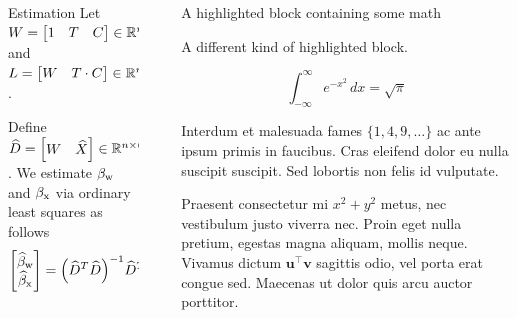 \documentclass[final]{beamer}
\newlength{\sepwidth}
\newlength{\colwidth}
\newcommand{\separatorcolumn}{\begin{column}{\sepwidth}\end{column}}
\begin{document}
\begin{frame}[t]
\begin{columns}[t]
\begin{column}{\colwidth}
\begin{block}{Estimation}
    Let $W = \begin{bmatrix} 1 & T & C \end{bmatrix} \in \mathbb{R}^{n \times (p + 2)}$ and $L = \begin{bmatrix} W & T \cdot C \end{bmatrix} \in \mathbb{R}^{n \times (2 p + 2)}$.

    Define $\widehat{D} = \begin{bmatrix} W & \widehat{X} \end{bmatrix} \in \mathbb{R}^{n \times (2 + p + d)}$. We estimate $\beta_\text{w}$ and $\beta_\text{x}$ via ordinary least squares as follows
    \begin{equation*}
        \begin{bmatrix}
            \betawhat \\
            \betaxhat
        \end{bmatrix}
        = \paren*{\Dhat^T \Dhat}^{-1} \Dhat^T Y.
    \end{equation*}

    
  \end{block}

\end{column}

\separatorcolumn

\begin{column}{\colwidth}

  \begin{exampleblock}{A highlighted block containing some math}

    A different kind of highlighted block.

    $$
    \int_{-\infty}^{\infty} e^{-x^2}\,dx = \sqrt{\pi}
    $$

    Interdum et malesuada fames $\{1, 4, 9, \ldots\}$ ac ante ipsum primis in
    faucibus. Cras eleifend dolor eu nulla suscipit suscipit. Sed lobortis non
    felis id vulputate.


    Praesent consectetur mi $x^2 + y^2$ metus, nec vestibulum justo viverra
    nec. Proin eget nulla pretium, egestas magna aliquam, mollis neque. Vivamus
    dictum $\mathbf{u}^\intercal\mathbf{v}$ sagittis odio, vel porta erat
    congue sed. Maecenas ut dolor quis arcu auctor porttitor.


\end{exampleblock}
\end{column}
\end{columns}
\end{frame}
\end{document}
